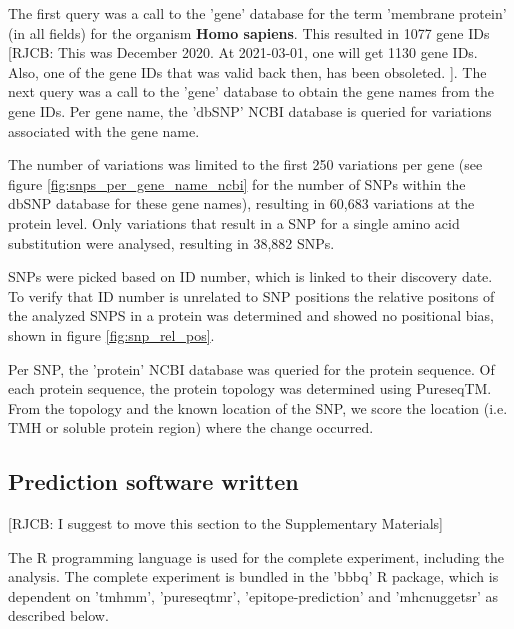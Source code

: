 
The first query was a call to the 'gene' database for the 
term 'membrane protein' (in all fields) for the organism \textbf{Homo sapiens}.
This resulted in 1077 gene IDs
[RJCB:
  This was December 2020.
  At 2021-03-01, one will get 1130 gene IDs.
  Also, one of the gene IDs that was valid back then,
  has been obsoleted.
].
The next query was a call to the 'gene' database 
to obtain the gene names from the gene IDs.
Per gene name, the 'dbSNP' NCBI database is queried for 
variations associated with the gene name. 

The number of variations
was limited to the first 250 variations per gene (see figure
\ref{fig:snps_per_gene_name_ncbi} for the number of SNPs
within the dbSNP database for these gene names),
resulting in 60,683 variations at the protein level.
Only variations that result in a SNP for
a single amino acid substitution were analysed, resulting in 38,882 SNPs.

%
SNPs were picked based on ID number, which is linked to their discovery date. To verify that ID number is unrelated to SNP positions the relative positons of the analyzed SNPS in a protein was determined and showed no positional bias, shown in figure \ref{fig:snp_rel_pos}.

Per SNP, the 'protein' NCBI database was queried for the
protein sequence.
Of each protein sequence, the protein topology was determined 
using PureseqTM.
From the topology and the known location of the SNP, 
we score the location (i.e. TMH or soluble protein region) 
where the change occurred.

\subsection{Prediction software written}

[RJCB: I suggest to move this section to the Supplementary Materials]

The R programming language is used for the complete 
experiment, including the analysis.
The complete experiment is bundled in the 'bbbq' R package,
which is dependent on 'tmhmm', 'pureseqtmr', 
'epitope-prediction' and 'mhcnuggetsr'
as described below.

